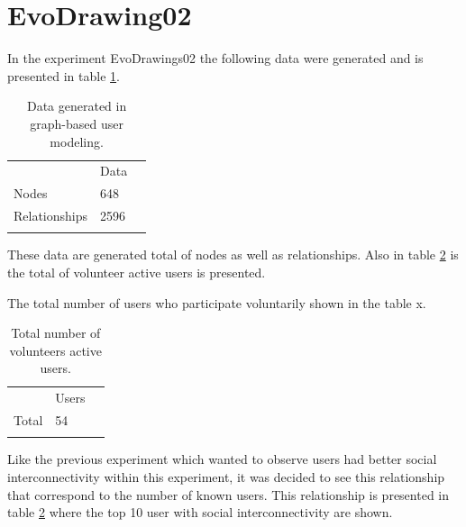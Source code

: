 \section {EvoDrawing02}


In the experiment EvoDrawings02 the following data were generated and is presented in table \ref{tab:dataGenerated_2}.


\begin{table}
\small
\caption{Data generated in graph-based user modeling.}
\label{tab:dataGenerated_2} 
\centering
\small
\begin{tabular}{p{3cm} p{3cm} p{3cm} }
\hline\noalign{\smallskip}
  & Data &  \\
\noalign{\smallskip}\hline\noalign{\smallskip}
\small{Nodes} & \small{648} & \\ \hline  
\small{Relationships} & \small{2596} & \\ \hline  
  
\noalign{\smallskip}\hline
\end{tabular}
\end{table}

These data are generated total of nodes as well as relationships. Also in table
\ref{tab:totalUsers_1} is the total of volunteer active users is presented.

The total number of users who participate voluntarily shown in the table x.

\begin{table}
\small
\caption{Total number of volunteers active users.}
\label{tab:totalUsers_1} 
\centering
\small
\begin{tabular}{p{3cm} p{3cm} p{3cm} }
\hline\noalign{\smallskip}
  & Users &  \\
\noalign{\smallskip}\hline\noalign{\smallskip}
\small{Total } & \small{54} & \\ \hline    
\noalign{\smallskip}\hline
\end{tabular}
\end{table}

Like the previous experiment which wanted to observe users had better social
interconnectivity within this experiment, it was decided to see this
relationship that correspond to the number of known users. This relationship is
presented in table \ref{tab:totalUsers_1} where the top 10 user  with social
interconnectivity are shown.


